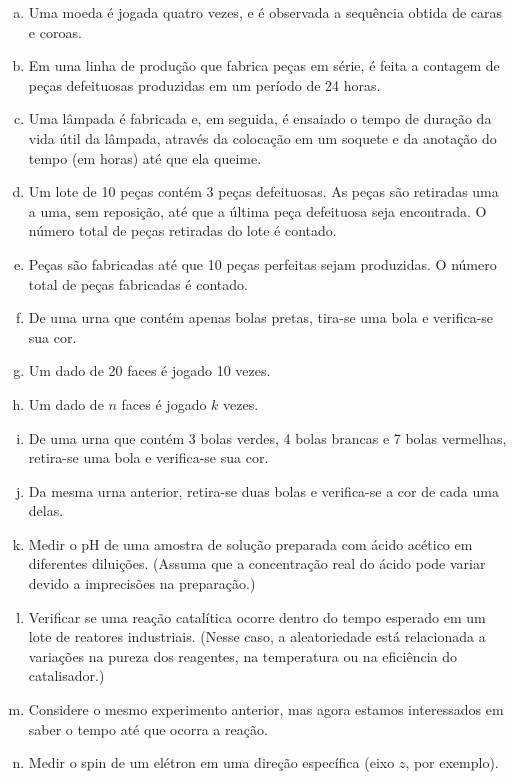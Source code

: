 \documentclass{article}
\begin{document}
\begin{enumerate}[a)]
    \item Uma moeda é jogada quatro vezes, e é observada a sequência obtida de caras e coroas.
    \item Em uma linha de produção que fabrica peças em série, é feita a contagem de peças defeituosas produzidas em um período de 24 horas.
    \item Uma lâmpada é fabricada e, em seguida, é ensaiado o tempo de duração da vida útil da lâmpada, através da colocação em um soquete e da anotação do tempo (em horas) até que ela queime.
    \item Um lote de 10 peças contém 3 peças defeituosas. As peças são retiradas uma a uma, sem reposição, até que a última peça defeituosa seja encontrada. O número total de peças retiradas do lote é contado.
    \item Peças são fabricadas até que 10 peças perfeitas sejam produzidas. O número total de peças fabricadas é contado.
    \item De uma urna que contém apenas bolas pretas, tira-se uma bola e verifica-se sua cor.
    \item Um dado de 20 faces é jogado 10 vezes.
    \item Um dado de $n$ faces é jogado $k$ vezes.
    \item De uma urna que contém 3 bolas verdes, 4 bolas brancas e 7 bolas vermelhas, retira-se uma bola e verifica-se sua cor.
    \item Da mesma urna anterior, retira-se duas bolas e verifica-se a cor de cada uma delas.
    \item Medir o pH de uma amostra de solução preparada com ácido acético em diferentes diluições. (Assuma que a concentração real do ácido pode variar devido a imprecisões na preparação.)
    \item Verificar se uma reação catalítica ocorre dentro do tempo esperado em um lote de reatores industriais. (Nesse caso, a aleatoriedade está relacionada a variações na pureza dos reagentes, na temperatura ou na eficiência do catalisador.)
    \item Considere o mesmo experimento anterior, mas agora estamos interessados em saber o tempo até que ocorra a reação.
    \item Medir o spin de um elétron em uma direção específica (eixo $z$, por exemplo).
\end{enumerate}

\vspace{5px}
\end{document}
